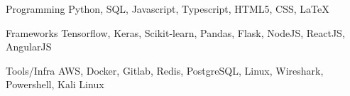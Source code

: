 

\begin{cvskills}

  \cvskill
    {Programming} %
    {Python, SQL, Javascript, Typescript, HTML5, CSS, LaTeX} %


  \cvskill
    {Frameworks} %
    {Tensorflow, Keras, Scikit-learn, Pandas, Flask, NodeJS, ReactJS, AngularJS} %

  \cvskill
    {Tools/Infra} %
    {AWS, Docker, Gitlab, Redis, PostgreSQL, Linux, Wireshark, Powershell, Kali Linux} %




\end{cvskills}
